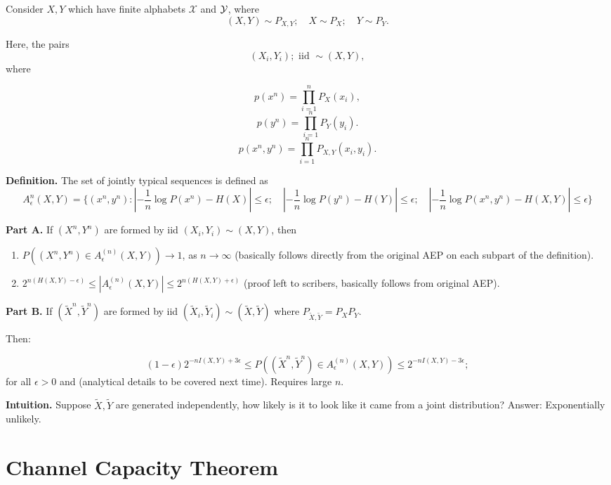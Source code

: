 \documentclass[12pt]{extarticle}
\def\XX{\mathcal{X}}
\begin{document}
Consider $X, Y$ which have finite alphabets $\XX$ and $\mathcal{Y}$, where
\[
  (X, Y) \sim P_{X, Y}; \quad X \sim P_X; \quad Y \sim P_Y.
\]

Here, the pairs
\[
  (X_i, Y_i); \text{ iid } \sim (X, Y),
\]
where 

\[
  p(x^n) = \prod_{i=1}^{n} P_X(x_i),
\]
\[
  p(y^n) = \prod_{i=1}^{n} P_Y (y_i).
\]
\[
  p(x^n, y^n) = \prod_{i=1}^{n} P_{X, Y} (x_i, y_i).
\]

{\bf Definition.} The set of jointly typical sequences is defined as
\[
  A^{n}_{\epsilon} (X, Y) = \{ (x^n, y^n): \left |-\frac{1}{n} \log P(x^n) - H(X) \right | \leq \epsilon; \quad \left | - \frac{1}{n} \log P(y^n) - H(Y) \right | \leq \epsilon; \quad \left |- \frac{1}{n} \log P(x^n, y^n) - H(X, Y) \right | \leq \epsilon\}
\]

{\bf Part A.} If $(X^n, Y^n)$ are formed by iid $(X_i, Y_i) \sim (X, Y)$, then

\def\typ{A_{\epsilon}^{(n)} (X, Y)}
\begin{enumerate}
  \item $ P( (X^n, Y^n) \in A_{\epsilon}^{(n)} (X, Y)) \to 1$, as $n \to \infty$ (basically follows directly from the original AEP on each subpart of the definition).

  \item $ 2^{n(H(X, Y) - \epsilon)} \leq | \typ | \leq 2^{n (H(X, Y) + \epsilon)}$ (proof left to scribers, basically follows from original AEP).
\end{enumerate}

{\bf Part B.} If $(\tilde{X}^n, \tilde{Y}^n)$ are formed  by iid $(\tilde{X}_i, \tilde{Y}_i) \sim (\tilde{X}, \tilde{Y})$ where $P_{\tilde{X}, \tilde{Y}} = P_X P_Y$.

Then:

\def\Xt{\tilde{X}}
\def\Yt{\tilde{Y}}

\[
  (1 - \epsilon) 2^{-n I(X, Y) + 3 \epsilon} \leq P( (\Xt^n, \Yt^n)  \in \typ ) \leq 2^{-n I(X, Y) - 3 \epsilon};
\]
for all $\epsilon > 0$ and (analytical details to be covered next time).  Requires large $n$.

{\bf Intuition.} Suppose $\Xt, \Yt$ are generated independently, how likely is it to look like it came from a joint distribution?  Answer: Exponentially unlikely.


\section{Channel Capacity Theorem}
\end{document}
